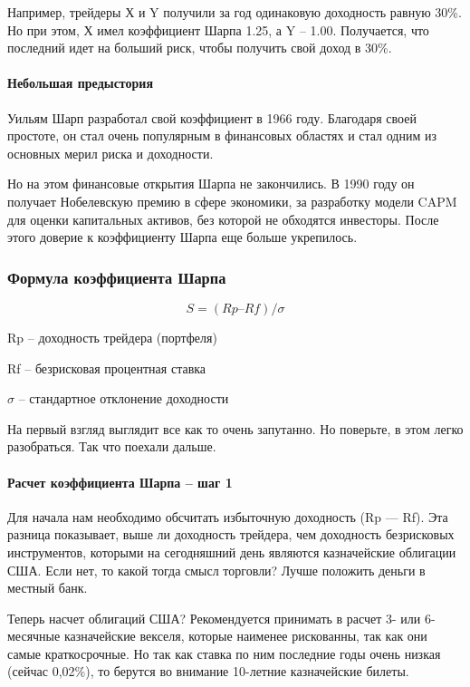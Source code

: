 \documentclass[a5paper]{article}
\begin{document}
Например, трейдеры Х и Y получили за год одинаковую доходность равную
30\%. Но при этом, Х имел коэффициент Шарпа 1.25, а Y –
1.00. Получается, что последний идет на больший риск, чтобы получить
свой доход в 30\%.

\paragraph{Небольшая предыстория}

Уильям Шарп разработал свой коэффициент в 1966 году. Благодаря своей простоте, он стал очень популярным в финансовых областях и стал одним из основных мерил риска и доходности.

Но на этом финансовые открытия Шарпа не закончились. В 1990 году он
получает Нобелевскую премию в сфере экономики, за разработку модели
CAPM для оценки капитальных активов, без которой не обходятся
инвесторы. После этого доверие к коэффициенту Шарпа еще больше
укрепилось.

\subsubsection{Формула коэффициента Шарпа}

$$S = (Rp – Rf)/\sigma$$

Rp – доходность трейдера (портфеля)

Rf – безрисковая процентная ставка

$\sigma$ – стандартное отклонение доходности

На первый взгляд выглядит все как то очень запутанно. Но поверьте, в
этом легко разобраться. Так что поехали дальше.

\paragraph{Расчет коэффициента Шарпа – шаг 1}

Для начала нам необходимо обсчитать избыточную доходность (Rp — Rf). Эта разница показывает, выше ли доходность трейдера, чем доходность безрисковых инструментов, которыми на сегодняшний день являются казначейские облигации США. Если нет, то какой тогда смысл торговли? Лучше положить деньги в местный банк.

Теперь насчет облигаций США? Рекомендуется принимать в расчет 3- или 6-месячные казначейские векселя, которые наименее рискованны, так как они самые краткосрочные. Но так как ставка по ним последние годы очень низкая (сейчас 0,02\%), то берутся во внимание 10-летние казначейские билеты.
\end{document}
